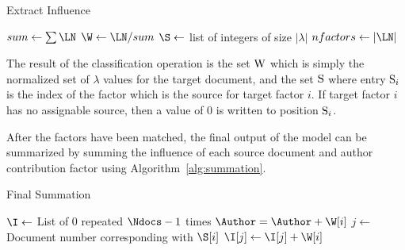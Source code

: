 \documentclass[../ut-dissertation.tex]{subfiles}
\begin{document}
\begin{algorithm}[p]
  \caption{Extract Influence}
  \label{alg:influence}
   
   
  
  \Output{\W, \S}
  \BlankLine
  $sum \leftarrow \sum \LN$\;
  $\W \leftarrow \LN / sum$\;
  $\S \leftarrow$ list of integers of size $|\lambda|$\;
  $nfactors \leftarrow |\LN|$\;
  \Return{\W, \S}\;
\end{algorithm}
\FloatBarrier

The result of the classification operation is the set $\mathrm{W}$ which
is simply the normalized set of $\lambda$ values for the target
document, and the set $\mathrm{S}$ where entry $\mathrm{S}_i$ is the index
of the factor which is the source for target factor $i$.  If target
factor $i$ has no assignable source, then a value of 0 is written to
position $\mathrm{S}_i$.

After the factors have been matched, the final output of the model can
be summarized by summing the influence of each source document and
author contribution factor using Algorithm~\ref{alg:summation}.

\begin{algorithm}[p]
  \caption{Final Summation}
  \label{alg:summation}
   
   
  
  \Input{\Ndocs, \S, \W}
  \Output{\I, \Author}
  \BlankLine
  $\I \leftarrow $ List of 0 repeated $\Ndocs-1$ times\;
   {
     {
      $\Author = \Author + \W[i]$\;
    }{
      $j \leftarrow $ Document number corresponding with $\S[i]$\;
      $\I[j] \leftarrow \I[j] + \W[i]$\;
    }
  }
\end{algorithm}
\FloatBarrier
\end{document}
